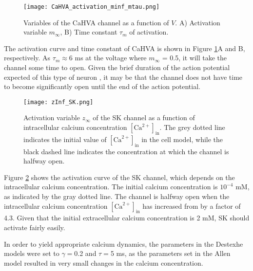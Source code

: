 \documentclass[times, twoside]{zHenriquesLab-StyleBioRxiv}
\begin{document}
\begin{figure}%
\centering
\texttt{[image: CaHVA\_activation\_minf\_mtau.png]}
\caption{Variables of the CaHVA channel as a function of $V$. A) Activation variable $m_\infty$, B) Time constant $\tau_m$ of activation.} %
\label{fig:CaHVA_activation_minf_mtau}
\end{figure}

The activation curve and time constant of CaHVA is shown in Figure  \ref{fig:CaHVA_activation_minf_mtau}A and B, respectively. As $\tau_m\approx6$ ms at the voltage where $m_\infty$ = 0.5, it will take the channel some time to open. Given the brief duration of the action potential expected of this type of neuron \cite{bartos_functional_2012}, it may be that the channel does not have time to become significantly open until the end of the action potential. %

\begin{figure}%
\centering
\texttt{[image: zInf\_SK.png]}
\caption{Activation variable $z_\infty$ of the SK channel as a function of intracellular calcium concentration $[\text{Ca}^{2+}]_\text{in}$. The grey dotted line indicates the initial value of $[\text{Ca}^{2+}]_\text{in}$ in the cell model, while the black dashed line indicates the concentration at which the channel is halfway open.}
\label{fig:SK_activation_zinf}
\end{figure}

Figure \ref{fig:SK_activation_zinf} shows the activation curve of the SK channel, which depends on the intracellular calcium concentration. The initial calcium concentration is $10^{-4}$ mM, as indicated by the gray dotted line. The channel is halfway open when the intracellular calcium concentration $[\text{Ca}^{2+}]_\text{in}$ has increased from by a factor of 4.3. Given that the initial extracellular calcium concentration is 2 mM, SK should activate fairly easily. %

In order to yield appropriate calcium dynamics, the parameters in the Destexhe models were set to $\gamma=$0.2 and $\tau=$5 ms, as the parameters set in the Allen model resulted in very small changes in the calcium concentration.  %
\end{document}

